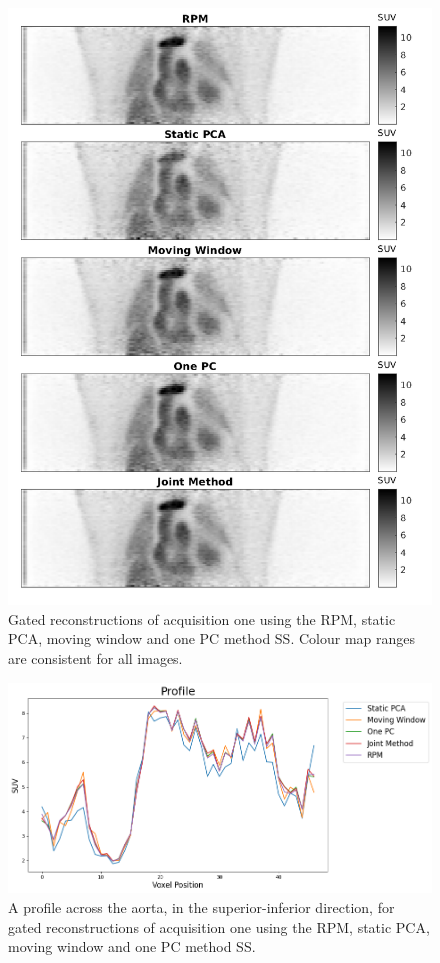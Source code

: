     \begin{figure}
        \vspace{-0.5cm}
        \centering
        \includegraphics[width=0.8\linewidth]{figures/visual_analysis_pca.png}
        \captionsetup{singlelinecheck=false, justification=centering}
        \caption{Gated reconstructions of acquisition one using the \gls{RPM}, static \gls{PCA}, moving window and one \gls{PC} method \gls{SS}. Colour map ranges are consistent for all images.}
        \label{fig:visual_analysis}
        \vspace{-0.5cm}
    \end{figure}
    
    \begin{figure}
        \vspace{-0.0cm}
        \centering
        \includegraphics[width=1.0\linewidth]{figures/profile_pca.png}
        \captionsetup{singlelinecheck=false, justification=centering}
        \caption{A profile across the aorta, in the superior-inferior direction, for gated reconstructions of acquisition one using the \gls{RPM}, static \gls{PCA}, moving window and one \gls{PC} method \gls{SS}.}
        \label{fig:profile}
        \vspace{-0.5cm}
    \end{figure}
    
